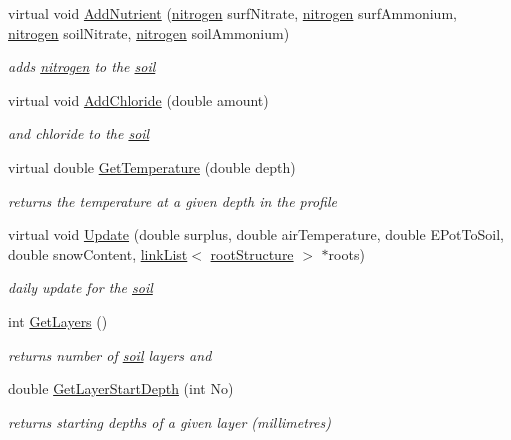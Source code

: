 \begin{DoxyCompactItemize}
virtual void \hyperlink{classsoil_a827be6e854fe4893b5856774abb0bc8f}{AddNutrient} (\hyperlink{classnitrogen}{nitrogen} surfNitrate, \hyperlink{classnitrogen}{nitrogen} surfAmmonium, \hyperlink{classnitrogen}{nitrogen} soilNitrate, \hyperlink{classnitrogen}{nitrogen} soilAmmonium)
\begin{DoxyCompactList}\small\item\em adds \hyperlink{classnitrogen}{nitrogen} to the \hyperlink{classsoil}{soil} \item\end{DoxyCompactList}\item 
virtual void \hyperlink{classsoil_a557304fe67eb65871ce2c751faec1f2e}{AddChloride} (double amount)
\begin{DoxyCompactList}\small\item\em and chloride to the \hyperlink{classsoil}{soil} \item\end{DoxyCompactList}\item 
virtual double \hyperlink{classsoil_a30a2ef147290c60895e4c389ad3c72b8}{GetTemperature} (double depth)
\begin{DoxyCompactList}\small\item\em returns the temperature at a given depth in the profile \item\end{DoxyCompactList}\item 
virtual void \hyperlink{classsoil_a79a9daafbc7c61b4a5392ac22f36ed5e}{Update} (double surplus, double airTemperature, double EPotToSoil, double snowContent, \hyperlink{classlink_list}{linkList}$<$ \hyperlink{structroot_structure}{rootStructure} $>$ $\ast$roots)
\begin{DoxyCompactList}\small\item\em daily update for the \hyperlink{classsoil}{soil} \item\end{DoxyCompactList}\item 
int \hyperlink{classsoil_a815f1ebcaf7c7fa7a11c91ebf6edf800}{GetLayers} ()
\begin{DoxyCompactList}\small\item\em returns number of \hyperlink{classsoil}{soil} layers and \item\end{DoxyCompactList}\item 
double \hyperlink{classsoil_acd6c1b86da5c93a694b15d52cfb26a51}{GetLayerStartDepth} (int No)
\begin{DoxyCompactList}\small\item\em returns starting depths of a given layer (millimetres) \item\end{DoxyCompactList}\item 

\end{DoxyCompactItemize}
